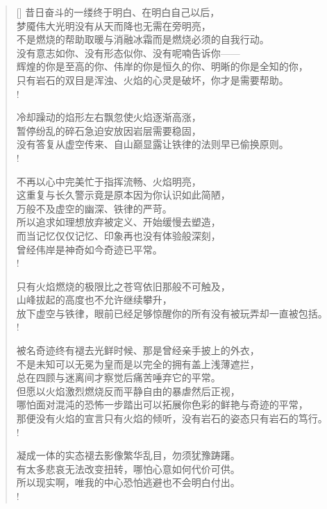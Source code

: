 \documentclass[UTF8, 12pt, a4paper]{ctexrep} %
\begin{document}
\begin{verse}[\versewidth]
昔日奋斗的一缕终于明白、在明白自己以后，\\
梦魇伟大光明没有从天而降也无需在旁明亮，\\
不是燃烧的帮助取暖与消融冰霜而是燃烧必须的自我行动。\\
没有意志如你、没有形态似你、没有呢喃告诉你——\\
辉煌的你是至高的你、伟岸的你是恒久的你、明晰的你是全知的你，\\
只有岩石的双目是浑浊、火焰的心灵是破坏，你才是需要帮助。\\!

冷却躁动的焰形左右飘忽使火焰逐渐高涨，\\
暂停纷乱的碎石急迫安放因岩层需要稳固，\\
没有答复从虚空传来、自山巅显露让铁律的法则早已偷换原则。\\!

不再以心中完美忙于指挥流畅、火焰明亮，\\
这重复与长久警示竟是原本因为你认识如此简陋，\\
万般不及虚空的幽深、铁律的严苛。\\
所以追求如理想放弃被定义、开始缓慢去塑造，\\
而当记忆仅仅记忆、印象再也没有体验般深刻，\\
曾经伟岸是神奇如今奇迹已平常。\\!

只有火焰燃烧的极限比之苍穹依旧那般不可触及，\\
山峰拔起的高度也不允许继续攀升，\\
放下虚空与铁律，眼前已经足够惊醒你的所有没有被玩弄却一直被包括。\\!

被名奇迹终有褪去光鲜时候、那是曾经亲手披上的外衣，\\
不是未知可以无冕为皇而是以完全的拥有盖上浅薄遮拦，\\
总在四顾与迷离间才察觉后痛苦唾弃它的平常。\\
但愿以火焰激烈燃烧反而平静自由的暴虐然后正视，\\
哪怕面对混沌的恐怖一步踏出可以拓展你色彩的鲜艳与奇迹的平常，\\
那便没有火焰的宣言只有火焰的倾听，没有岩石的姿态只有岩石的笃行。\\!

凝成一体的实态褪去影像繁华乱目，勿须犹豫踌躇。\\
有太多悲哀无法改变扭转，哪怕心意如何代价可供。\\
所以现实啊，唯我的中心恐怕逃避也不会明白付出。\\!


\end{verse}
\end{document}
